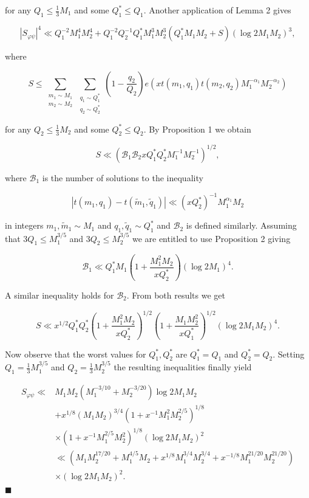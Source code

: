\documentclass[10pt]{article}
\newcommand{\proofend}{\hfill\(\blacksquare\)}
\begin{document}
for any $Q_{1} \leqslant \frac{1}{3} M_{1}$ and some $Q_{1}^{*} \leqslant Q_{1}$. Another application of Lemma 2 gives

$$
\left|S_{\varphi\psi}\right|^{4} \ll Q_{1}^{-2} M_{1}^{4} M_{2}^{4}+Q_{1}^{-2} Q_{2}^{-1} Q_{1}^{*} M_{1}^{3} M_{2}^{3}\left(Q_{1}^{*} M_{1} M_{2}+S\right)\left(\log 2 M_{1} M_{2}\right)^{3},
$$

where

$$
S \leqslant \sum_{\substack{m_{1} \sim M_{1} \\ m_{2} \sim M_{2}}}
\sum_{\substack{q_{1} \sim Q_{1}^{*} \\ q_{2} \sim Q_{2}^{*}}}
\left(1-\frac{q_{2}}{Q_{2}}\right)e\left(x t\left(m_{1}, q_{1}\right) t\left(m_{2}, q_{2}\right) M_{1}^{-\alpha_{1}} M_{2}^{-\alpha_{2}}\right)
$$

for any $Q_{2} \leqslant \frac{1}{3} M_{2}$ and some $Q_{2}^{*} \leqslant Q_{2}$. By Proposition 1 we obtain

$$
S \ll\left(\mathscr{B}_{1}\mathscr{B}_{2}xQ_{1}^{*}Q_{2}^{*}M_{1}^{-1}M_{2}^{-1}\right)^{1/2},
$$

where $\mathscr{B}_{1}$ is the number of solutions to the inequality

$$
\left|t\left(m_{1}, q_{1}\right)-t\left(\tilde{m}_{1}, \tilde{q}_{1}\right)\right| \ll\left(x Q_{2}^{*}\right)^{-1} M_{1}^{\alpha_{1}} M_{2}
$$

in integers $m_{1}, \tilde{m}_{1} \sim M_{1}$ and $q_{1}, \tilde{q}_{1} \sim Q_{1}^{*}$ and $\mathscr{B}_{2}$ is defined similarly. Assuming that $3 Q_{1} \leqslant M_{1}^{3 / 5}$ and $3 Q_{2} \leqslant M_{2}^{3 / 5}$ we are entitled to use Proposition 2 giving

$$
\mathscr{B}_{1} \ll Q_{1}^{*} M_{1}\left(1+\frac{M_{1}^{2} M_{2}}{x Q_{2}^{*}}\right)\left(\log 2 M_{1}\right)^{4} .
$$

A similar inequality holds for $\mathscr{B}_{2}$. From both results we get

$$
S \ll x^{1 / 2} Q_{1}^{*} Q_{2}^{*}\left(1+\frac{M_{1}^{2} M_{2}}{x Q_{2}^{*}}\right)^{1 / 2}\left(1+\frac{M_{1} M_{2}^{2}}{x Q_{1}^{*}}\right)^{1 / 2}\left(\log 2 M_{1} M_{2}\right)^{4} .
$$

Now observe that the worst values for $Q_{1}^{*}, Q_{2}^{*}$ are $Q_{1}^{*}=Q_{1}$ and $Q_{2}^{*}=Q_{2}$. Setting $Q_{1}=\frac{1}{3} M_{1}^{3 / 5}$ and $Q_{2}=\frac{1}{3} M_{2}^{3 / 5}$ the resulting inequalities finally yield

$$
\begin{aligned}
S_{\varphi\psi} \ll & M_{1} M_{2}\left(M_{1}^{-3 / 10}+M_{2}^{-3 / 20}\right) \log 2 M_{1} M_{2} \\
& +x^{1 / 8}\left(M_{1} M_{2}\right)^{3 / 4}\left(1+x^{-1} M_{1}^{2} M_{2}^{2 / 5}\right)^{1 / 8} \\
& \times\left(1+x^{-1} M_{1}^{2 / 5} M_{2}^{2}\right)^{1 / 8}\left(\log 2 M_{1} M_{2}\right)^{2} \\
& \ll\left(M_{1} M_{2}^{17 / 20}+M_{1}^{4 / 5} M_{2}+x^{1 / 8} M_{1}^{3 / 4} M_{2}^{3 / 4}+x^{-1 / 8} M_{1}^{21 / 20} M_{2}^{21 / 20}\right) \\
& \times\left(\log 2 M_{1} M_{2}\right)^{2} .
\end{aligned}
$$
\proofend
\end{document}
